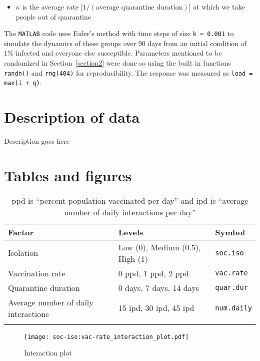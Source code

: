 \documentclass[12pt,a4paper]{article}
\begin{document}
\begin{appendices}
\begin{itemize}
	\vspace*{-3mm}
	\item $\kappa$ is the average rate [$1/(\text{average quarantine duration})$] at which we take people out of quarantine
\end{itemize}
The \verb`MATLAB` code uses Euler's method with time steps of size \verb`k = 0.001` to simulate the dynamics of these groups over $90$ days from an initial condition of $1\%$ infected and everyone else susceptible. Parameters mentioned to be randomized in Section~\ref{section2} were done so using the built in functions \verb`randn()` and \verb`rng(404)` for reproducibility. The response was measured as \verb`load = max(i + q)`.

\section{Description of data}\label{appendixB}
Description goes here

\section{Tables and figures}\label{appendixC}

\begin{table}[H]
    \centering
    \begin{tabular}{l l l}\hline
         Factor &  Levels & Symbol \\ \hline\hline
         Isolation & Low (0), Medium (0.5), High (1) & \verb`soc.iso` \\ \hline
         Vaccination rate & 0 \si{ppd}, 1 \si{ppd}, 2 \si{ppd} & \verb`vac.rate` \\ \hline
         Quarantine duration & 0 days, 7 days, 14 days & \verb`quar.dur`\\ \hline
         Average number of daily interactions & 15 \si{ipd}, 30 \si{ipd}, 45 \si{ipd} & \verb`num.daily` \\ \hline \\
    \end{tabular}
    \caption{\si{ppd} is ``percent population vaccinated per day'' and \si{ipd} is ``average number of daily interactions per day''}
    \label{tab:factor_summary}
\end{table}

\begin{figure}[H]
	\texttt{[image: soc-iso:vac-rate\_interaction\_plot.pdf]}
	\caption{Interaction plot}	 %
	\label{fig:soc.iso:vac.rate_interaction}
\end{figure}





\end{appendices}
\end{document}
